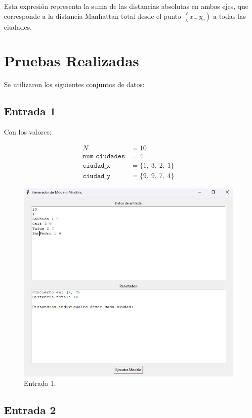 \documentclass[conference]{IEEEtran}
\begin{document}
Esta expresión representa la suma de las distancias absolutas en ambos ejes, que corresponde a la distancia Manhattan total desde el punto $(x_c, y_c)$ a todas las ciudades.


\section{Pruebas Realizadas}
Se utilizaron los siguientes conjuntos de datos:

\subsection{Entrada 1}

Con los valores:

\begin{align*}
	N &= 10 \\
	\texttt{num\_ciudades} &= 4 \\
	\texttt{ciudad\_x} &= \{1,\ 3,\ 2,\ 1\} \\
	\texttt{ciudad\_y} &= \{9,\ 9,\ 7,\ 4\}
\end{align*}

\begin{figure}[h]
	\centering
	\includegraphics[width=1.0\linewidth]{images/entrada1}
	\caption{Entrada 1.}
	\label{fig:entrada1}
\end{figure}

\subsection{Entrada 2}
\end{document}
